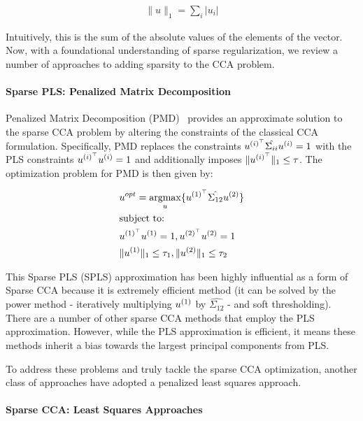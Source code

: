 \begin{align}
    \|u\|_1 = \sum_i |u_i|
\end{align}

Intuitively, this is the sum of the absolute values of the elements of the vector.
Now, with a foundational understanding of sparse regularization, we review a number of approaches to adding sparsity to the CCA problem.

\paragraph{Sparse PLS: Penalized Matrix Decomposition}
Penalized Matrix Decomposition (PMD)~\citep{witten2009penalized} provides an approximate solution to the sparse CCA problem by altering the constraints of the classical CCA formulation.
Specifically, PMD replaces the constraints \(u^{(i)^{\top}} \hat{\Sigma_{ii}} u^{(i)} = 1\) with the PLS constraints \(u^{(i)^{\top}} u^{(i)}= 1\) and additionally imposes \(\|u^{(i)^{\top}}\|_1 \leq \tau\).
The optimization problem for PMD is then given by:

\begin{align}
    & u^{opt}=\underset{u}{\mathrm{argmax}}\{ u^{(1)^{\top}} \hat{\Sigma_{12}} u^{(2)} \} \\
    & \text{subject to:} \notag \\
    & u^{(1)^{\top}} u^{(1)} = 1 , u^{(2)^{\top}} u^{(2)} = 1 \notag \\
    & \|u^{(1)}\|_1 \leq \tau_1 , \|u^{(2)}\|_1 \leq \tau_2 \notag
\end{align}

This Sparse PLS (SPLS) approximation has been highly influential as a form of Sparse CCA because it is extremely efficient method (it can be solved by the power method - iteratively multiplying $u^{(1)}$ by $\hat{\Sigma_{12}}$ - and soft thresholding).
There are a number of other sparse CCA methods that employ the PLS approximation\citep{parkhomenko2009sparse, waaijenborg2008quantifying, lindenbaum2021l0}.
However, while the PLS approximation is efficient, it means these methods inherit a bias towards the largest principal components from PLS.

To address these problems and truly tackle the sparse CCA optimization, another class of approaches have adopted a penalized least squares approach.

\paragraph{Sparse CCA: Least Squares Approaches}


